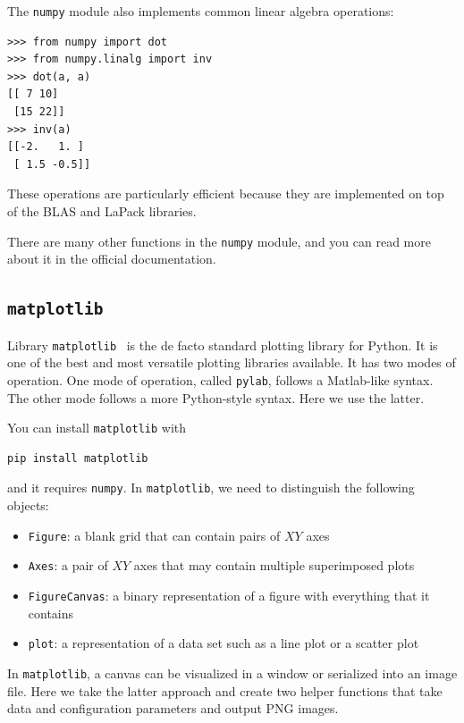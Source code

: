 \documentclass[justified, sixbynine]{tufte-book}
\def\ft{\small\tt}
\theoremstyle{plain}%
\newtheorem * {corollary}{Corollary}
\theoremstyle{definition}
\theoremstyle{remark}
\newtheorem * {remark}{Remark}
\newtheorem * {note}{Note}
\begin{document}
\begin{fullwidth}
The {\ft numpy} module also implements common linear algebra operations:

\begin{lstlisting}
>>> from numpy import dot
>>> from numpy.linalg import inv
>>> dot(a, a)
[[ 7 10]
 [15 22]]
>>> inv(a)
[[-2.   1. ]
 [ 1.5 -0.5]]
\end{lstlisting}

These operations are particularly efficient because they are implemented on top of the BLAS and LaPack libraries.

There are many other functions in the {\ft numpy} module, and you can read more about it in the official documentation.

\goodbreak\subsection{{\ft matplotlib}}


Library {\ft matplotlib}~\cite{matplotlib} is the de facto standard plotting library for Python. It is one of the best and most versatile plotting libraries available. It has two modes of operation. One mode of operation, called {\ft pylab}, follows a Matlab-like syntax. The other mode follows a more Python-style syntax. Here we use the latter.

You can install {\ft matplotlib} with
\begin{lstlisting}
pip install matplotlib
\end{lstlisting}
and it requires {\ft numpy}.
In {\ft matplotlib}, we need to distinguish the following objects:
\begin{itemize}
\item {\ft Figure}: a blank grid that can contain pairs of $XY$ axes
\item {\ft Axes}: a pair of $XY$ axes that may contain multiple superimposed plots
\item {\ft FigureCanvas}: a binary representation of a figure with everything that it contains
\item {\ft plot}: a representation of a data set such as a line plot or a scatter plot
\end{itemize}

In {\ft matplotlib}, a canvas can be visualized in a window or serialized into an image file. Here we take the latter approach and create two helper functions that take data and configuration parameters and output PNG images.


\end{fullwidth}
\end{document}
